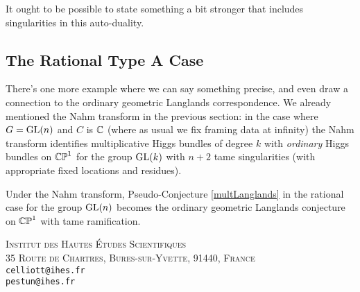 \documentclass[10pt, oneside]{article}
\begin{document}
It ought to be possible to state something a bit stronger that includes singularities in this auto-duality.

\subsection{The Rational Type A Case}
There's one more example where we can say something precise, and even draw a connection to the ordinary geometric Langlands correspondence.  We already mentioned the Nahm transform in the previous section: in the case where $G = \mathrm{GL}(n)$ and $C$ is $\mathbb{C}$ (where as usual we fix framing data at infinity) the Nahm transform identifies multiplicative Higgs bundles of degree $k$ with \emph{ordinary} Higgs bundles on $\mathbb{CP}^1$ for the group $\mathrm{GL}(k)$ with $n+2$ tame singularities (with appropriate fixed locations and residues).

\begin{claim}
Under the Nahm transform, Pseudo-Conjecture \ref{multLanglands} in the rational case for the group $\mathrm{GL}(n)$ becomes the ordinary geometric Langlands conjecture on $\mathbb{CP}^1$ with tame ramification.
\end{claim}

 
\pagestyle{bib}



\textsc{Institut des Hautes \'Etudes Scientifiques}\\
\textsc{35 Route de Chartres, Bures-sur-Yvette, 91440, France}\\
\texttt{celliott@ihes.fr}\\ 
\texttt{pestun@ihes.fr}
 
\end{document}
